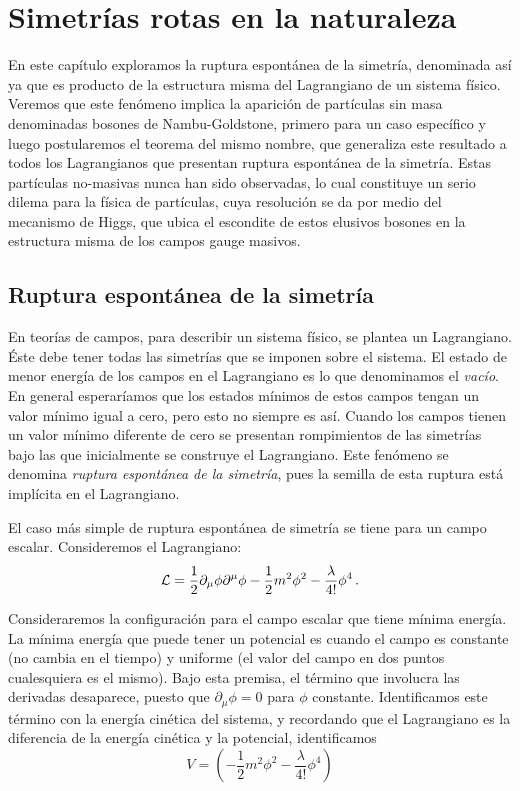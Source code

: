 \chapter{Simetrías rotas en la naturaleza}
\label{ch:simetriasRotas}

En este capítulo exploramos la ruptura espontánea de la simetría, denominada así ya que es producto de la estructura misma del Lagrangiano de un sistema físico. Veremos que este fenómeno implica la aparición de partículas sin masa denominadas bosones de Nambu-Goldstone, primero para un caso específico y luego postularemos el teorema del mismo nombre, que generaliza este resultado a todos los Lagrangianos que presentan ruptura espontánea de la simetría. Estas partículas no-masivas nunca han sido observadas, lo cual constituye un serio dilema para la física de partículas, cuya resolución se da por medio del mecanismo de Higgs, que ubica el escondite de estos elusivos bosones en la estructura misma de los campos gauge masivos.




\section{Ruptura espontánea de la simetría}

En teorías de campos, para describir un sistema físico, se plantea un Lagrangiano. Éste debe tener todas las simetrías que se imponen sobre el sistema. El estado de menor energía de los campos en el Lagrangiano es lo que denominamos el \emph{vacío}. En general esperaríamos que los estados mínimos de estos campos tengan un valor mínimo igual a cero, pero esto no siempre es así. Cuando los campos tienen un valor mínimo diferente de cero se presentan rompimientos de las simetrías bajo las que inicialmente se construye el Lagrangiano. Este fenómeno se denomina \emph{ruptura espontánea de la simetría}, pues la semilla de esta ruptura está implícita en el Lagrangiano.

El caso más simple de ruptura espontánea de simetría se tiene para un campo escalar. Consideremos el Lagrangiano:
%
\begin{equation} \label{eq:lagrangianoEscalar_paraRuptura}
    \mathcal{L} = \frac{1}{2} \partial_\mu \phi \partial^\mu \phi - \frac{1}{2} m^2 \phi^2 - \frac{\lambda}{4!} \phi^4 \,.
\end{equation}

Consideraremos la configuración para el campo escalar que tiene mínima energía. La mínima energía que puede tener un potencial es cuando el campo es constante (no cambia en el tiempo) y uniforme (el valor del campo en dos puntos cualesquiera es el mismo). Bajo esta premisa, el término que involucra las derivadas desaparece, puesto que $\partial_\mu \phi = 0$ para $\phi$ constante. Identificamos este término con la energía cinética del sistema, y recordando que el Lagrangiano es la diferencia de la energía cinética y la potencial, identificamos
%
\begin{equation}
    V = (- \frac{1}{2} m^2 \phi^2 - \frac{\lambda}{4!} \phi^4)
\end{equation}

